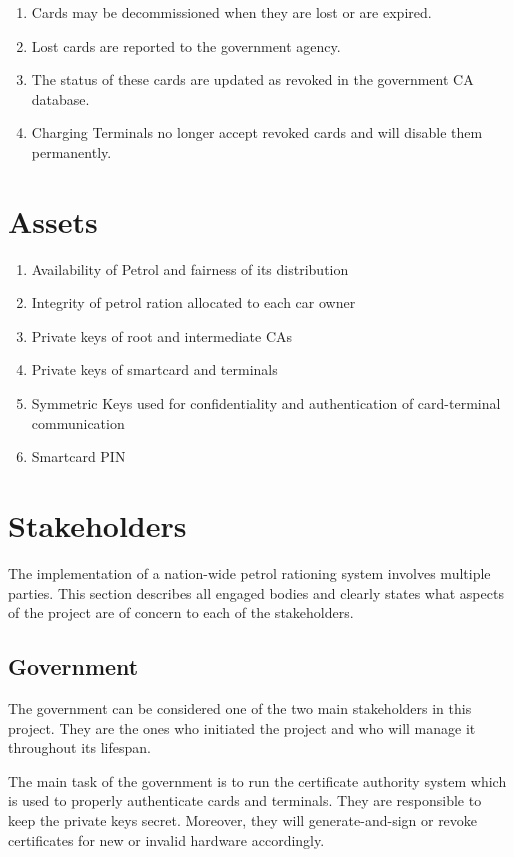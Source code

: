 \documentclass[a4paper,10pt]{llncs}
\begin{document}
\begin{enumerate}
  \item Cards may be decommissioned when they are lost or are expired.
  \item Lost cards are reported to the government agency.
  \item The status of these cards are updated as revoked in the government CA database.
  \item Charging Terminals no longer accept revoked cards and will disable them permanently.
\end{enumerate}


\section{Assets}

\begin{enumerate}
  \item Availability of Petrol and fairness of its distribution
  \item Integrity of petrol ration allocated to each car owner
  \item Private keys of root and intermediate CAs
  \item Private keys of smartcard and terminals
  \item Symmetric Keys used for confidentiality and authentication of card-terminal communication
  \item Smartcard PIN
\end{enumerate}

\section{Stakeholders}
The implementation of a nation-wide petrol rationing system involves multiple parties. This section describes all engaged bodies and clearly states what aspects of the project are of concern to each of the stakeholders.

\subsection{Government}

The government can be considered one of the two main stakeholders in this project. They are the ones who initiated the project and who will manage it throughout its lifespan.

The main task of the government is to run the certificate authority system which is used to properly authenticate cards and terminals. They are responsible to keep the private keys secret. Moreover, they will generate-and-sign or revoke certificates for new or invalid hardware accordingly.
\end{document}
